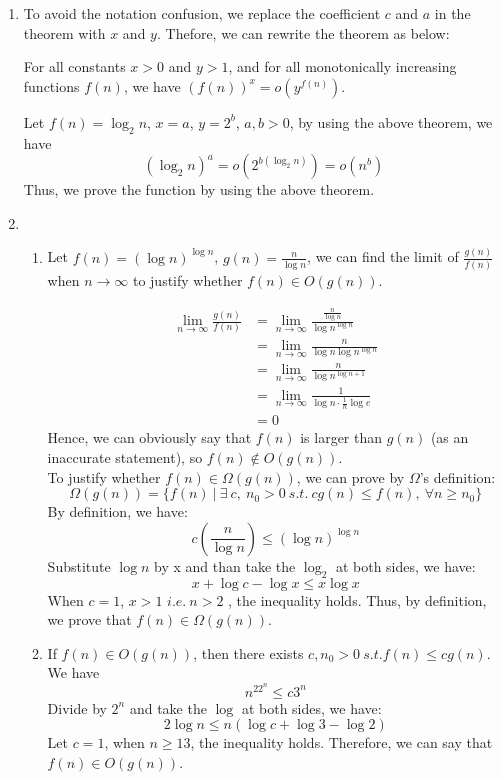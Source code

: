 \documentclass[a4paper,12pt]{article}
\begin{document}
\begin{enumerate}

\item {
To avoid the notation confusion, we replace the coefficient $c$ and $a$ in the theorem with $x$ and $y$. Thefore, we can rewrite the theorem as below:

For all constants $x > 0$ and $y > 1$, and for all monotonically increasing functions $f(n)$, we have $(f(n))^x=o(y^{f(n)})$.

Let $f(n)=\log_2n$, $x = a$, $y = 2^b$, $a,b > 0$, by using the above theorem, we have
\[
(\log_2n)^a = o(2^{b(\log_{2}n)}) = o(n^b)
\]
Thus, we prove the function by using the above theorem.
}

\item{}
\begin{enumerate}
    \item{ %
    Let $f(n) = (\log n)^{\log n}$, $g(n) = \frac{n}{\log n}$, we can find the limit of $\frac{g(n)}{f(n)}$ when $n \rightarrow \infty $ to justify whether $f(n) \in O(g(n))$.
    
\[
\begin{split}
\lim_{n \rightarrow \infty} \frac{g(n)}{f(n)} & = \lim_{n \rightarrow \infty} \frac{\frac{n}{\log n}}{\log n^{\log n}} \\
& = \lim_{n \rightarrow \infty} \frac{n}{\log n \log n^{\log n}} \\
& = \lim_{n \rightarrow \infty} \frac{n}{\log n^{\log n + 1}} \\
& = \lim_{n \rightarrow \infty} \frac{1}{\log n \cdot \frac{1}{n}\log e} \\
& = 0
\end{split}
\]
Hence, we can obviously say that $f(n)$ is larger than $g(n)$ (as an inaccurate statement), so $f(n) \notin O(g(n))$. \\
To justify whether $f(n) \in \Omega (g(n))$, we can prove by $\Omega$'s definition:
\[
\Omega (g(n)) = \{ f(n) \ | \ \exists \ c, \ n_0 > 0 \ s.t. \ cg(n) \leq f(n), \ \forall n \geq n_0 \} 
\]
By definition, we have:
\[
c(\frac{n}{\log n}) \leq (\log n)^{\log n}
\]
Substitute $\log n$ by x and than take the $\log _2$ at both sides, we have:
\[
x + \log c - \log x \leq x \log x
\]
When $c=1$, $x > 1$ $i.e. \ n > 2$ , the inequality holds. Thus, by definition, we prove that $f(n) \in \Omega (g(n))$.
    }
    
    \item{ %
    If $f(n) \in O(g(n))$, then there exists $c, n_0 > 0 \ s.t. f(n)\leq cg(n)$. We have
\[
n^22^n \leq c3^n 
\]
Divide by $2^n$ and take the $\log$ at both sides, we have:
\[
2\log n \leq n(\log c+\log 3-\log 2)
\]
Let $c=1$, when $n \geq 13$, the inequality holds. Therefore, we can say that $f(n) \in O(g(n))$. 
    
}
\end{enumerate}
\end{enumerate}
\end{document}
